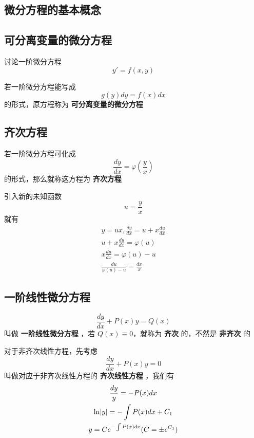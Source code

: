\documentclass[11pt]{article}
\begin{document}
\subsection{微分方程的基本概念}
\label{sec:org3cee66a}
\subsection{可分离变量的微分方程}
\label{sec:orgc856599}
讨论一阶微分方程
\begin{equation*}
y'=f(x,y)
\end{equation*}

若一阶微分方程能写成
\begin{equation*}
g(y)dy=f(x)dx
\end{equation*}
的形式，原方程称为 \textbf{可分离变量的微分方程}
\subsection{齐次方程}
\label{sec:orgd498909}
若一阶微分方程可化成
\begin{equation*}
\frac{dy}{dx}=\varphi(\frac{y}{x})
\end{equation*}
的形式，那么就称这方程为 \textbf{齐次方程}

引入新的未知函数
\begin{equation*}
u=\frac{y}{x}
\end{equation*}
就有
\begin{gather*}
y=ux,\frac{dy}{dx}=u+x\frac{du}{dx}\\
u+x\frac{du}{dx}=\varphi(u)\\
x\frac{du}{dx}=\varphi(u)-u\\
\frac{du}{\varphi(u)-u}=\frac{dx}{x}
\end{gather*}
\subsection{一阶线性微分方程}
\label{sec:org1936cbd}
\begin{equation*}
\frac{dy}{dx}+P(x)y=Q(x)
\end{equation*}
叫做 \textbf{一阶线性微分方程} ，若 \(Q(x)\equiv0\)，就称为  \textbf{齐次} 的，不然是 \textbf{非齐次}
的

对于非齐次线性方程，先考虑
\begin{equation*}
\frac{dy}{dx}+P(x)y=0
\end{equation*}
叫做对应于非齐次线性方程的 \textbf{齐次线性方程} ，我们有
\begin{gather*}
\frac{dy}{y}=-P(x)dx\\
\ln\abs{y}=-\int P(x)dx+C_1\\
y=Ce^{-\int P(x)dx}(C=\pm e^{C_1})
\end{gather*}
\end{document}
